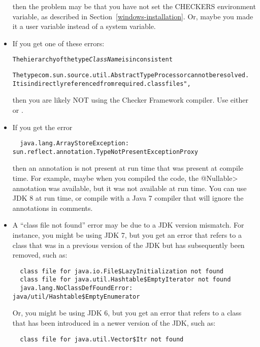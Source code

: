\begin{itemize}
\noindent
then the problem may be that you have not set the CHECKERS environment
variable, as described in Section~\ref{windows-installation}.  Or, maybe
you made it a user variable instead of a system variable.

\item
If you get one of these errors:

\begin{alltt}
The hierarchy of the type \emph{ClassName} is inconsistent

The type com.sun.source.util.AbstractTypeProcessor cannot be resolved.
  It is indirectly referenced from required .class files", 
\end{alltt}

\noindent
then you are likely NOT using the Checker Framework compiler.  Use
either  or .

\item
If you get the error

\begin{Verbatim}
  java.lang.ArrayStoreException: sun.reflect.annotation.TypeNotPresentExceptionProxy
\end{Verbatim}

\noindent
then an annotation is not present at run time that was present at compile
time.  For example, maybe when you compiled the code, the \<@Nullable>
annotation was available, but it was not available at run time.
You can use JDK 8 at run time, or compile
with a Java 7 compiler that will ignore the annotations in comments.

\item
A ``class file not found'' error may be due to a JDK version mismatch.
For instance, you might be using JDK 7, but you get an error that refers to a class that was in a
previous version of the JDK but has subsequently been removed, such as:

\begin{Verbatim}
  class file for java.io.File$LazyInitialization not found
  class file for java.util.Hashtable$EmptyIterator not found
  java.lang.NoClassDefFoundError: java/util/Hashtable$EmptyEnumerator
\end{Verbatim}

Or, you might be using JDK 6, but you get an error that refers to a class
that has been introduced in a newer version of the JDK, such as:

\begin{Verbatim}
  class file for java.util.Vector$Itr not found
\end{Verbatim}


\end{itemize}
